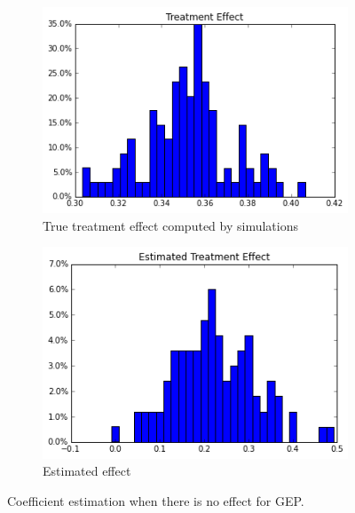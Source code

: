 \documentclass[11pt]{article}
\begin{document}
\begin{figure}[h]
\centering
\begin{subfigure}{.5\textwidth}
  \centering
  \includegraphics[width=.9\linewidth]{treatment_effect.png}
  \caption{True treatment effect computed by simulations}
  \label{fig:sub1}
\end{subfigure}%
\begin{subfigure}{.5\textwidth}
  \centering
  \includegraphics[width=.9\linewidth]{estimated_treatment_effect.png}
  \caption{Estimated effect}
  \label{fig:sub2}
\end{subfigure}
\caption{Coefficient estimation when there is no effect for GEP.}
\label{fig:large_effect_gps}
\end{figure}
\end{document}
